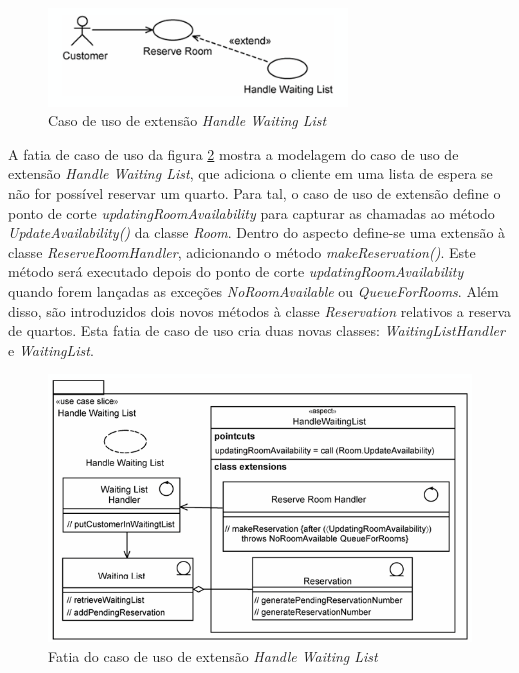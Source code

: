 \begin{figure}
	\centering
	\includegraphics[width=300px]{img/jacobson_use_case_extension.png}
	\caption{Caso de uso de extensão
	\textit{Handle Waiting List}}\label{fig:jacobson_use_case_extension}
\end{figure}

A fatia de caso de uso da figura \ref{fig:jacobson_handle_waiting_list_slice} mostra a modelagem do caso de uso de extensão \textit{Handle Waiting
List}, que adiciona o cliente em uma lista de espera se não for possível reservar um quarto. Para tal, o caso de uso de extensão define o ponto de
corte \textit{updatingRoomAvailability} para capturar as chamadas ao método \textit{UpdateAvailability()} da classe \textit{Room}. Dentro do aspecto
define-se uma extensão à classe \textit{ReserveRoomHandler}, adicionando o método \textit{makeReservation()}. Este método será executado depois
do ponto de corte \textit{updatingRoomAvailability} quando forem lançadas as exceções \textit{NoRoomAvailable} ou \textit{QueueForRooms}. Além disso,
são introduzidos dois novos métodos à classe \textit{Reservation} relativos a reserva de quartos. Esta fatia de caso de uso cria duas novas classes:
\textit{WaitingListHandler} e \textit{WaitingList}.

\begin{figure}
	\centering
	\includegraphics[width=450px]{img/jacobson_handle_waiting_list_slice.png}
	\caption{Fatia do caso de uso de extensão \textit{Handle Waiting List}}\label{fig:jacobson_handle_waiting_list_slice}
\end{figure}

